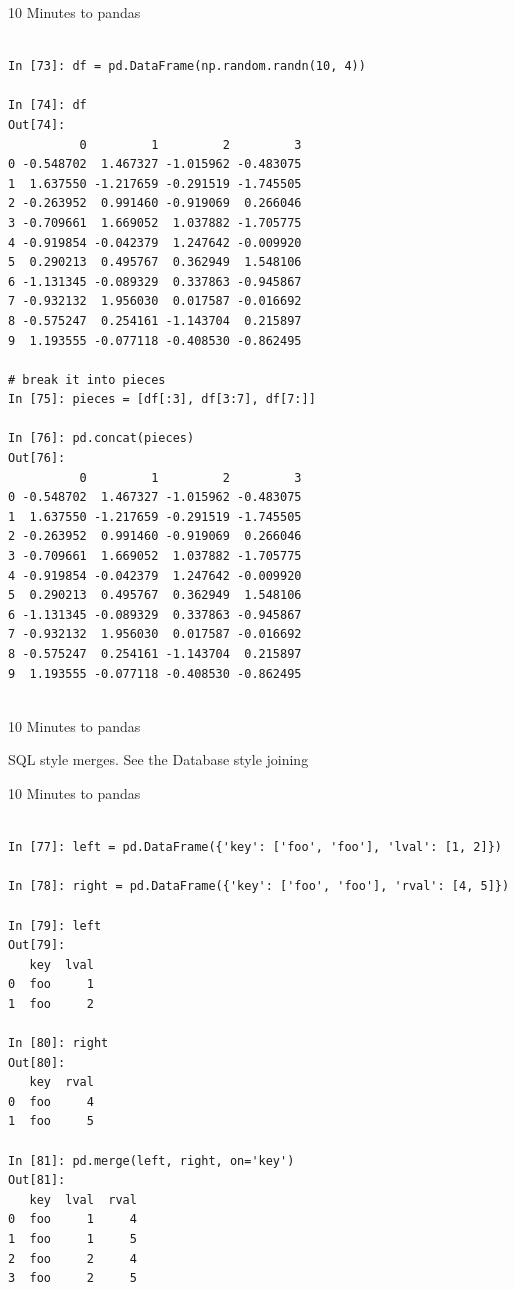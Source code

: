 \documentclass{beamer}
\begin{document}
\begin{frame}[t,fragile]{10 Minutes to pandas}


	\scriptsize
\begin{verbatim}

In [73]: df = pd.DataFrame(np.random.randn(10, 4))

In [74]: df
Out[74]: 
          0         1         2         3
0 -0.548702  1.467327 -1.015962 -0.483075
1  1.637550 -1.217659 -0.291519 -1.745505
2 -0.263952  0.991460 -0.919069  0.266046
3 -0.709661  1.669052  1.037882 -1.705775
4 -0.919854 -0.042379  1.247642 -0.009920
5  0.290213  0.495767  0.362949  1.548106
6 -1.131345 -0.089329  0.337863 -0.945867
7 -0.932132  1.956030  0.017587 -0.016692
8 -0.575247  0.254161 -1.143704  0.215897
9  1.193555 -0.077118 -0.408530 -0.862495

# break it into pieces
In [75]: pieces = [df[:3], df[3:7], df[7:]]

In [76]: pd.concat(pieces)
Out[76]: 
          0         1         2         3
0 -0.548702  1.467327 -1.015962 -0.483075
1  1.637550 -1.217659 -0.291519 -1.745505
2 -0.263952  0.991460 -0.919069  0.266046
3 -0.709661  1.669052  1.037882 -1.705775
4 -0.919854 -0.042379  1.247642 -0.009920
5  0.290213  0.495767  0.362949  1.548106
6 -1.131345 -0.089329  0.337863 -0.945867
7 -0.932132  1.956030  0.017587 -0.016692
8 -0.575247  0.254161 -1.143704  0.215897
9  1.193555 -0.077118 -0.408530 -0.862495


\end{verbatim}


\end{frame}


\begin{frame}[t]{10 Minutes to pandas}

SQL style merges. See the Database style joining

\end{frame}


\begin{frame}[t,fragile]{10 Minutes to pandas}


	\scriptsize
\begin{verbatim}

In [77]: left = pd.DataFrame({'key': ['foo', 'foo'], 'lval': [1, 2]})

In [78]: right = pd.DataFrame({'key': ['foo', 'foo'], 'rval': [4, 5]})

In [79]: left
Out[79]: 
   key  lval
0  foo     1
1  foo     2

In [80]: right
Out[80]: 
   key  rval
0  foo     4
1  foo     5

In [81]: pd.merge(left, right, on='key')
Out[81]: 
   key  lval  rval
0  foo     1     4
1  foo     1     5
2  foo     2     4
3  foo     2     5


\end{verbatim}


\end{frame}
\end{document}
